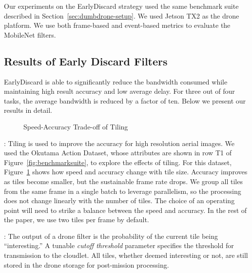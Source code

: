 Our experiments on the {\xc EarlyDiscard}
strategy used the same benchmark suite described in
Section~\ref{sec:dumbdrone-setup}. We used Jetson TX2 as the drone platform. We use
both frame-based and event-based metrics to evaluate the MobileNet filters.

\subsection{Results of Early Discard Filters}
\label{sec:earlydiscard-result}

EarlyDiscard is able to significantly reduce the bandwidth consumed while
maintaining high result accuracy and low average delay. For three out of four
tasks, the average bandwidth is reduced by a factor of ten. Below we present
our results in detail.

\begin{figure}
\centering
\hspace*{-0.3in}
\caption{Speed-Accuracy Trade-off of Tiling}
\label{fig:earlydiscard-tile-accuracy-speed}
\vspace{-0.1in}
\end{figure}


: Tiling is used to improve the accuracy
for high resolution aerial images. We used the Okutama Action Dataset, whose
attributes are shown in row T1 of Figure~\ref{fig:benchmarksuite}, to explore
the effects of tiling.  For this dataset,
Figure~\ref{fig:earlydiscard-tile-accuracy-speed} shows how speed and accuracy
change with tile size.  Accuracy improves as tiles become smaller, but the
sustainable frame rate drops.  We group all tiles from the same frame in a
single batch to leverage parallelism, so the processing does not change linearly
with the number of tiles. The choice of an operating point will need to strike a
balance between the speed and accuracy.  In the rest of the paper, we use two
tiles per frame by default. 

: The output of a drone filter is the
probability of the current tile being ``interesting.''  A tunable {\em cutoff
threshold} parameter specifies the threshold for transmission to the cloudlet.
All tiles, whether deemed interesting or not, are still stored in the drone
storage for post-mission processing.

